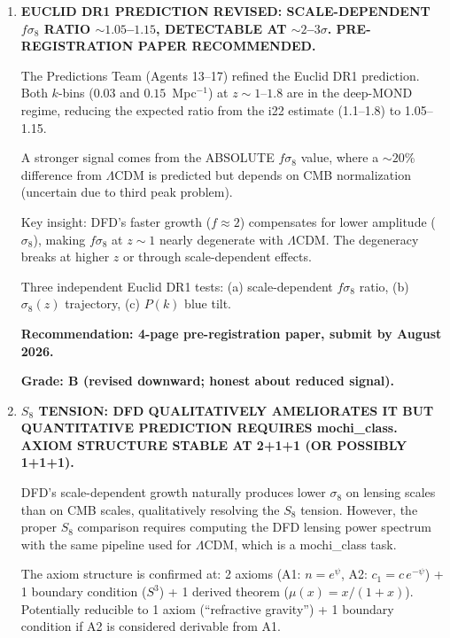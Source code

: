 \documentclass[11pt]{article}
\newcommand{\LCDM}{$\Lambda$CDM}
\newcommand{\Geff}{G_{\rm eff}}
\newcommand{\aM}{a_0}
\begin{document}
\begin{tcolorbox}[colback=blue!5!white, colframe=blue!70!black,
  title=\textbf{W4i23 TOP 5 FINDINGS (RANKED BY IMPACT)}]
\begin{enumerate}[label=\textbf{F\arabic*.}]
  \textbf{CORRECTION TO i22:}  On the third-peak scale ($\ell \approx
  810$, $k \approx 0.07$~Mpc$^{-1}$) at recombination, $g_N/\aM
  \approx 1.6$ (transition regime), NOT $\ll 1$ (deep MOND).  The
  $\Geff$ enhancement is $\sim 1.6\times$, not $\sim 7\times$.
  The $f_\psi$ baryon loading parameter is correspondingly reduced.

  \textbf{Grade: C (honest about failure of analytic methods).}

\item \textbf{EUCLID DR1 PREDICTION REVISED: SCALE-DEPENDENT $f\sigma_8$
  RATIO $\sim 1.05$--$1.15$, DETECTABLE AT $\sim 2$--$3\sigma$.
  PRE-REGISTRATION PAPER RECOMMENDED.}

  The Predictions Team (Agents 13--17) refined the Euclid DR1
  prediction.  Both $k$-bins ($0.03$ and $0.15$~Mpc$^{-1}$) at
  $z \sim 1$--$1.8$ are in the deep-MOND regime, reducing the
  expected ratio from the i22 estimate (1.1--1.8) to 1.05--1.15.

  A stronger signal comes from the ABSOLUTE $f\sigma_8$ value, where
  a $\sim 20$\% difference from \LCDM{} is predicted but depends on
  CMB normalization (uncertain due to third peak problem).

  Key insight: DFD's faster growth ($f \approx 2$) compensates for
  lower amplitude ($\sigma_8$), making $f\sigma_8$ at $z \sim 1$
  nearly degenerate with \LCDM.  The degeneracy breaks at higher $z$
  or through scale-dependent effects.

  Three independent Euclid DR1 tests:
  (a) scale-dependent $f\sigma_8$ ratio, (b) $\sigma_8(z)$ trajectory,
  (c) $P(k)$ blue tilt.

  \textbf{Recommendation: 4-page pre-registration paper, submit by
  August 2026.}

  \textbf{Grade: B (revised downward; honest about reduced signal).}

\item \textbf{$S_8$ TENSION: DFD QUALITATIVELY AMELIORATES IT BUT
  QUANTITATIVE PREDICTION REQUIRES mochi\_class.  AXIOM STRUCTURE
  STABLE AT 2+1+1 (OR POSSIBLY 1+1+1).}

  DFD's scale-dependent growth naturally produces lower $\sigma_8$ on
  lensing scales than on CMB scales, qualitatively resolving the $S_8$
  tension.  However, the proper $S_8$ comparison requires computing
  the DFD lensing power spectrum with the same pipeline used for \LCDM,
  which is a mochi\_class task.

  The axiom structure is confirmed at: 2 axioms (A1: $n = e^\psi$,
  A2: $c_1 = c\,e^{-\psi}$) + 1 boundary condition ($S^3$) + 1
  derived theorem ($\mu(x) = x/(1+x)$).  Potentially reducible to
  1 axiom (``refractive gravity'') + 1 boundary condition if A2 is
  considered derivable from A1.


\end{enumerate}
\end{tcolorbox}
\end{document}

